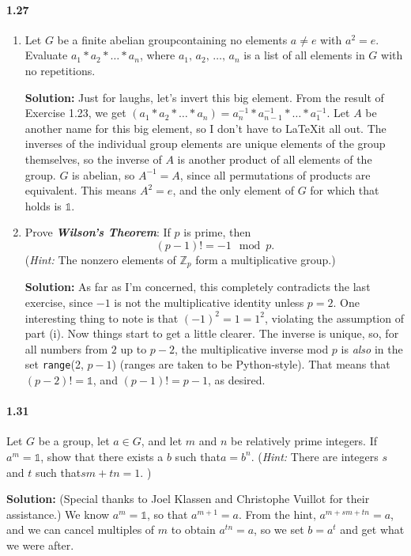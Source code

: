 \documentclass[12pt,a4paper]{article}
\providecommand{\id}{\mathbb{1}}
\providecommand{\FAG}{finite abelian group}
\providecommand{\bemph}[1]{\emph{\textbf{#1}}}
\providecommand{\hint}{\emph{Hint: }}
\providecommand{\soln}{\textbf{Solution: }}
\providecommand{\st}{such that\xspace}
\providecommand{\JK}{Joel Klassen\xspace}
\providecommand{\CV}{Christophe Vuillot\xspace}
\providecommand{\inv}{^{-1}}
\begin{document}
\paragraph{1.27}
\begin{enumerate}[label=(\roman*)]
\item Let $G$ be a \FAG containing no elements $a \neq e$ with $a^2 = e$. 
Evaluate $a_1 \ast a_2 \ast \ldots \ast a_n$, where $a_1,\, a_2,\, \ldots, \, a_n$ is a list of all elements in $G$ with no repetitions.

\soln Just for laughs, let's invert this big element.
From the result of Exercise 1.23, we get $(a_1 \ast a_2 \ast \ldots \ast a_n) = a_n\inv \ast a_{n-1}\inv \ast \ldots \ast a_1\inv$.
Let $A$ be another name for this big element, so I don't have to \LaTeX it all out. 
The inverses of the individual group elements are unique elements of the group themselves, so the inverse of $A$ is another product of all elements of the group. 
$G$ is abelian, so $A\inv = A$, since all permutations of products are equivalent.
This means $A^2=e$, and the only element of $G$ for which that holds is $\id$.
\item Prove \bemph{Wilson's Theorem}: If $p$ is prime, then
\begin{equation*}
(p-1)! = -1 \mod p.
\end{equation*}
(\hint The nonzero elements of $\mathbb{Z}_p$ form a multiplicative group.)

\soln As far as I'm concerned, this completely contradicts the last exercise, since $-1$ is not the multiplicative identity unless $p=2$. 
One interesting thing to note is that $(-1)^2 = 1 = 1^2$, violating the assumption of part (i).
Now things start to get a little clearer. The inverse is unique, so, for all numbers from $2$ up to $p-2$, the multiplicative inverse mod $p$ is \emph{also} in the set \texttt{range}(2, $p-1$) (ranges are taken to be Python-style). 
That means that $(p-2)! = \id$, and $(p-1)! = p-1$, as desired.
\end{enumerate}

\paragraph*{1.31}
Let $G$ be a group, let $a \in G$, and let $m$ and $n$ be relatively prime integers. 
If $a^m=\id$, show that there exists a $b$ \st $a=b^n$. 
(\hint There are integers $s$ and $t$ \st $sm + tn = 1$. )

\soln (Special thanks to \JK and \CV for their assistance.) We know $a^m = \id$, so that $a^{m + 1} = a$. 
From the hint, $a^{m + sm + tn} = a$, and we can cancel multiples of $m$ to obtain $a^{tn} = a$, so we set $b = a^t$ and get what we were after.
\end{document}
